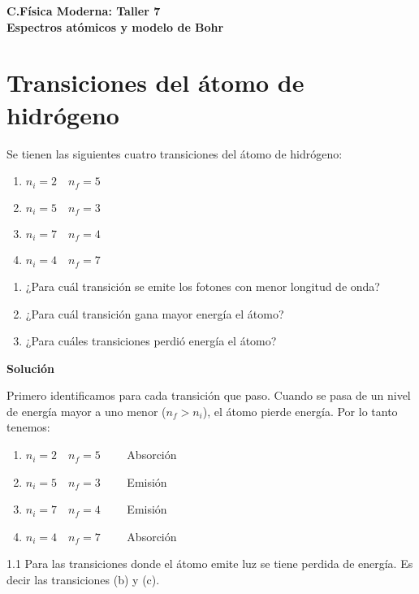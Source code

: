 \documentclass[12pt]{article}
\begin{document}
 
\begin{center}
\Large \textbf{C.Física Moderna: Taller 7}\\
\normalsize \textbf{Espectros atómicos y modelo de Bohr}
\end{center}
 
  

\section{Transiciones del átomo de hidrógeno}

Se tienen las siguientes cuatro transiciones del átomo de hidrógeno:

\begin{enumerate}[label=\alph*)]
	\item $n_i= 2\quad n_f= 5$
	\item $n_i=5 \quad n_f= 3$
	\item $n_i=7 \quad n_f=4$
	\item $n_i=4 \quad n_f=7$
\end{enumerate}

\begin{enumerate}
	\item  ¿Para cuál transición se emite los fotones con menor longitud de onda? 
	\item ¿Para cuál transición gana mayor
	energía el átomo?
	\item  ¿Para cuáles transiciones perdió energía el átomo?
\end{enumerate}



\begin{center}
	\textbf{Solución}
\end{center}

Primero identificamos para cada transición que paso. Cuando se pasa de un nivel de energía mayor a uno menor ($n_f>n_i$), el átomo pierde energía. Por lo tanto tenemos:

\begin{enumerate}[label=\alph*)]
	\item $n_i= 2\quad n_f= 5\qquad$  Absorción 
	\item $n_i=5 \quad n_f= 3 \qquad$ \color{yellow} Emisión \color{black}
	\item $n_i=7 \quad n_f=4\qquad$  \color{yellow} Emisión \color{black}
	\item $n_i=4 \quad n_f=7\qquad$	Absorción 
\end{enumerate}
1.1 Para las transiciones donde el átomo emite luz se tiene perdida de energía. Es decir las transiciones (b) y (c).\\
\end{document}
